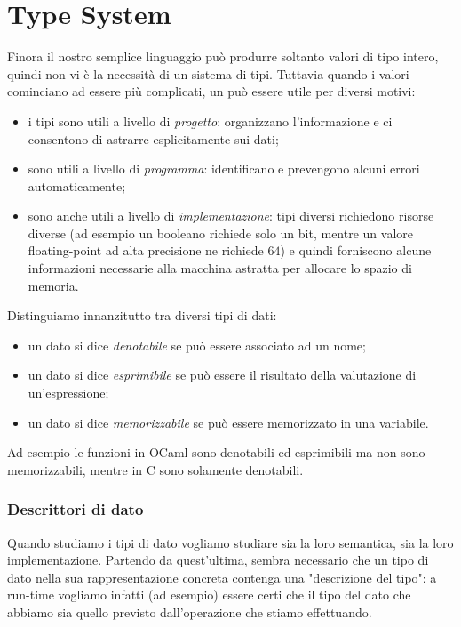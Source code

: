 \section{Type System}

Finora il nostro semplice linguaggio può produrre soltanto valori di tipo intero, quindi non vi è la necessità di un sistema di tipi. Tuttavia quando i valori cominciano ad essere più complicati, un  può essere utile per diversi motivi:
\begin{itemize}
    \item i tipi sono utili a livello di \emph{progetto}: organizzano l'informazione e ci consentono di astrarre esplicitamente sui dati;
    \item sono utili a livello di \emph{programma}: identificano e prevengono alcuni errori automaticamente;
    \item sono anche utili a livello di \emph{implementazione}: tipi diversi richiedono risorse diverse (ad esempio un booleano richiede solo un bit, mentre un valore floating-point ad alta precisione ne richiede $64$) e quindi forniscono alcune informazioni necessarie alla macchina astratta per allocare lo spazio di memoria.
\end{itemize}

Distinguiamo innanzitutto tra diversi tipi di dati:
\begin{itemize}
    \item un dato si dice \emph{denotabile} se può essere associato ad un nome;
    \item un dato si dice \emph{esprimibile} se può essere il risultato della valutazione di un'espressione;
    \item un dato si dice \emph{memorizzabile} se può essere memorizzato in una variabile.
\end{itemize}

Ad esempio le funzioni in OCaml sono denotabili ed esprimibili ma non sono memorizzabili, mentre in C sono solamente denotabili.

\subsubsection{Descrittori di dato}

Quando studiamo i tipi di dato vogliamo studiare sia la loro semantica, sia la loro implementazione. Partendo da quest'ultima, sembra necessario che un tipo di dato nella sua rappresentazione concreta contenga una "descrizione del tipo": a run-time vogliamo infatti (ad esempio) essere certi che il tipo del dato che abbiamo sia quello previsto dall'operazione che stiamo effettuando.

